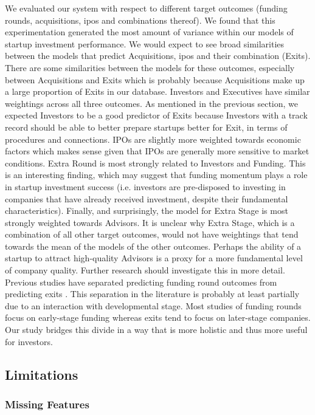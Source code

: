 \documentclass[../thesis/thesis.tex]{subfiles}
\begin{document}
We evaluated our system with respect to different target outcomes (funding rounds, acquisitions, \gls{ipo}s and combinations thereof). We found that this experimentation generated the most amount of variance within our models of startup investment performance. We would expect to see broad similarities between the models that predict Acquisitions, \gls{ipo}s and their combination (Exits). There are some similarities between the models for these outcomes, especially between Acquisitions and Exits which is probably because Acquisitions make up a large proportion of Exits in our database. Investors and Executives have similar weightings across all three outcomes. As mentioned in the previous section, we expected Investors to be a good predictor of Exits because Investors with a track record should be able to better prepare startups better for Exit, in terms of procedures and connections. IPOs are slightly more weighted towards economic factors which makes sense given that IPOs are generally more sensitive to market conditions. Extra Round is most strongly related to Investors and Funding. This is an interesting finding, which may suggest that funding momentum plays a role in startup investment success (i.e. investors are pre-disposed to investing in companies that have already received investment, despite their fundamental characteristics). Finally, and surprisingly, the model for Extra Stage is most strongly weighted towards Advisors. It is unclear why Extra Stage, which is a combination of all other target outcomes, would not have weightings that tend towards the mean of the models of the other outcomes. Perhaps the ability of a startup to attract high-quality Advisors is a proxy for a more fundamental level of company quality. Further research should investigate this in more detail. Previous studies have separated predicting funding round outcomes \cite{beckwith2016,yuan2016,ahlers2015,an2015} from predicting exits \cite{bhat2011}. This separation in the literature is probably at least partially due to an interaction with developmental stage. Most studies of funding rounds focus on early-stage funding whereas exits tend to focus on later-stage companies. Our study bridges this divide in a way that is more holistic and thus more useful for investors.

\subsection{Limitations}

\subsubsection{Missing Features}
\end{document}
